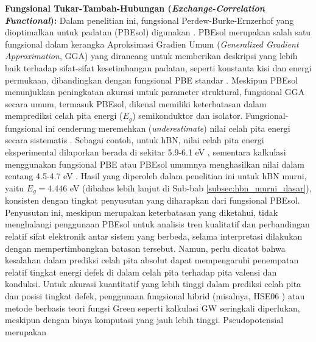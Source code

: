 \textbf{Fungsional Tukar-Tambah-Hubungan (\textit{Exchange-Correlation Functional}):}
Dalam penelitian ini, fungsional Perdew-Burke-Ernzerhof yang dioptimalkan untuk padatan (PBEsol) \citep{Perdew2008} digunakan . PBEsol merupakan salah satu fungsional dalam kerangka Aproksimasi Gradien Umum (\textit{Generalized Gradient Approximation}, GGA) yang dirancang untuk memberikan deskripsi yang lebih baik terhadap sifat-sifat kesetimbangan padatan, seperti konstanta kisi dan energi permukaan, dibandingkan dengan fungsional PBE standar \citep{Perdew1996}. Meskipun PBEsol menunjukkan peningkatan akurasi untuk parameter struktural, fungsional GGA secara umum, termasuk PBEsol, dikenal memiliki keterbatasan dalam memprediksi celah pita energi ($E_g$) semikonduktor dan isolator. Fungsional-fungsional ini cenderung meremehkan (\textit{underestimate}) nilai celah pita energi secara sistematis . Sebagai contoh, untuk hBN, nilai celah pita energi eksperimental dilaporkan berada di sekitar 5.9-6.1 eV \citep{Watanabe2004, Elias2019}, sementara kalkulasi menggunakan fungsional PBE atau PBEsol umumnya menghasilkan nilai dalam rentang 4.5-4.7 eV . Hasil yang diperoleh dalam penelitian ini untuk hBN murni, yaitu $E_g = 4.446$ eV (dibahas lebih lanjut di Sub-bab \ref{subsec:hbn_murni_dasar}), konsisten dengan tingkat penyusutan yang diharapkan dari fungsional PBEsol. Penyusutan ini, meskipun merupakan keterbatasan yang diketahui, tidak menghalangi penggunaan PBEsol untuk analisis tren kualitatif dan perbandingan relatif sifat elektronik antar sistem yang berbeda, selama interpretasi dilakukan dengan mempertimbangkan batasan tersebut. Namun, perlu dicatat bahwa kesalahan dalam prediksi celah pita absolut dapat mempengaruhi penempatan relatif tingkat energi defek di dalam celah pita terhadap pita valensi dan konduksi. Untuk akurasi kuantitatif yang lebih tinggi dalam prediksi celah pita dan posisi tingkat defek, penggunaan fungsional hibrid (misalnya, HSE06 \citep{Heyd2003, Heyd2006}) atau metode berbasis teori fungsi Green seperti kalkulasi GW \citep{Hedin1965} seringkali diperlukan, meskipun dengan biaya komputasi yang jauh lebih tinggi. Pseudopotensial merupakan 

